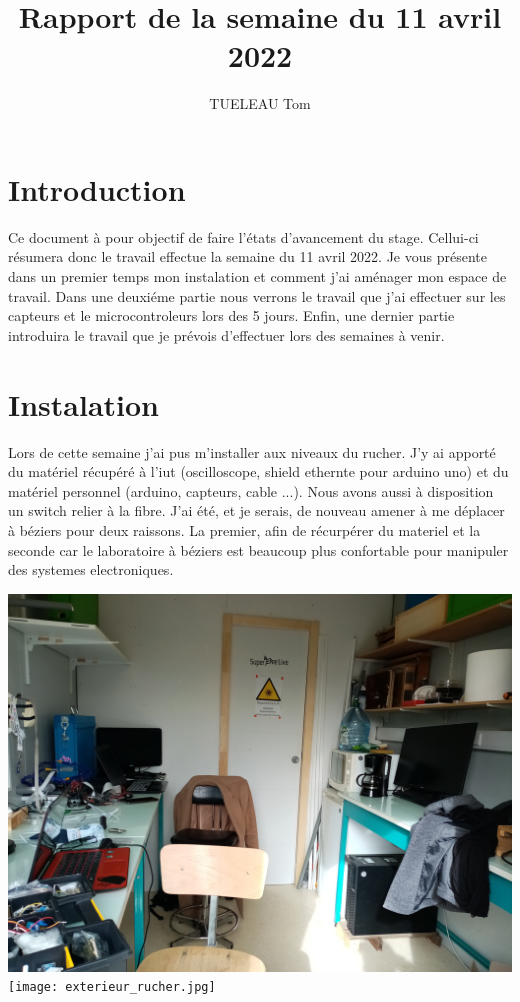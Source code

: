 \documentclass[5pt]{article}
\title{Rapport de la semaine du 11 avril 2022}
\author{TUELEAU Tom}
\begin{document}
\maketitle
\section{Introduction}
Ce document à pour objectif de faire l'états d'avancement du stage. Cellui-ci résumera donc le travail effectue la semaine du 11 avril 2022.
Je vous présente dans un premier temps mon instalation et comment j'ai aménager mon espace de travail. Dans une deuxiéme partie
nous verrons le travail que j'ai effectuer sur les capteurs et le microcontroleurs lors des 5 jours. Enfin, une dernier partie introduira le travail 
que je prévois d'effectuer lors des semaines à venir. 

\section{Instalation}
Lors de cette semaine j'ai pus m'installer aux niveaux du rucher. J'y ai apporté du matériel récupéré à l'iut (oscilloscope, shield ethernte pour
arduino uno) et du matériel personnel (arduino, capteurs, cable ...). Nous avons aussi à disposition un switch relier à la fibre. J'ai été, et je serais,
de nouveau amener à me déplacer à béziers pour deux raissons. La premier, afin de récurpérer du materiel et la seconde car le laboratoire à béziers est beaucoup
plus confortable pour manipuler des systemes electroniques.

\begin{center}	
\includegraphics[scale=0.08]{interieur_rucher.jpg}
\label{image1}
\texttt{[image: exterieur\_rucher.jpg]}
\label{image2}
\end{center}
\end{document}
